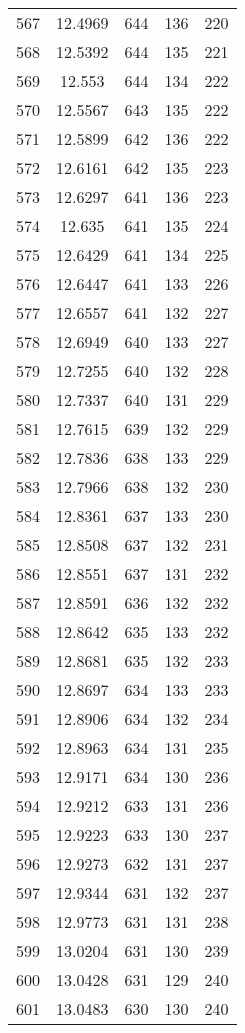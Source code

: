 \documentclass[12pt,a4paper]{article}
\begin{document}
\begin{tabular}{r|cccc}
	567 & 12.4969 & 644 & 136 & 220 \\
	568 & 12.5392 & 644 & 135 & 221 \\
	569 & 12.553 & 644 & 134 & 222 \\
	570 & 12.5567 & 643 & 135 & 222 \\
	571 & 12.5899 & 642 & 136 & 222 \\
	572 & 12.6161 & 642 & 135 & 223 \\
	573 & 12.6297 & 641 & 136 & 223 \\
	574 & 12.635 & 641 & 135 & 224 \\
	575 & 12.6429 & 641 & 134 & 225 \\
	576 & 12.6447 & 641 & 133 & 226 \\
	577 & 12.6557 & 641 & 132 & 227 \\
	578 & 12.6949 & 640 & 133 & 227 \\
	579 & 12.7255 & 640 & 132 & 228 \\
	580 & 12.7337 & 640 & 131 & 229 \\
	581 & 12.7615 & 639 & 132 & 229 \\
	582 & 12.7836 & 638 & 133 & 229 \\
	583 & 12.7966 & 638 & 132 & 230 \\
	584 & 12.8361 & 637 & 133 & 230 \\
	585 & 12.8508 & 637 & 132 & 231 \\
	586 & 12.8551 & 637 & 131 & 232 \\
	587 & 12.8591 & 636 & 132 & 232 \\
	588 & 12.8642 & 635 & 133 & 232 \\
	589 & 12.8681 & 635 & 132 & 233 \\
	590 & 12.8697 & 634 & 133 & 233 \\
	591 & 12.8906 & 634 & 132 & 234 \\
	592 & 12.8963 & 634 & 131 & 235 \\
	593 & 12.9171 & 634 & 130 & 236 \\
	594 & 12.9212 & 633 & 131 & 236 \\
	595 & 12.9223 & 633 & 130 & 237 \\
	596 & 12.9273 & 632 & 131 & 237 \\
	597 & 12.9344 & 631 & 132 & 237 \\
	598 & 12.9773 & 631 & 131 & 238 \\
	599 & 13.0204 & 631 & 130 & 239 \\
	600 & 13.0428 & 631 & 129 & 240 \\
	601 & 13.0483 & 630 & 130 & 240 \\

\end{tabular}
\end{document}
